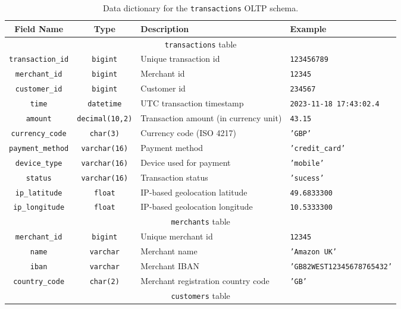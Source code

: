 \documentclass[11pt,a4paper,computermodern]{article}
\newcommand{\code}{\texttt}
\begin{document}
\begin{table}[ht]
	\centering
	\begin{threeparttable}
		\caption{Data dictionary for the \code{transactions} OLTP schema.}
		\label{table:OLTP}
		\begin{tabularx}{0.99\textwidth}{c c >{\centering\arraybackslash}X >{\centering\arraybackslash}X}
			\toprule
			Field Name & Type & Description & Example  \\
			\midrule
			\multicolumn{4}{c}{\code{transactions} table}\\
			\code{transaction\_id} & \code{bigint} & Unique transaction id & \code{123456789} \\
			\code{merchant\_id} & \code{bigint} & Merchant id & \code{12345} \\
			\code{customer\_id} & \code{bigint} & Customer id & \code{234567} \\
			\code{time} & \code{datetime} & UTC transaction timestamp & \code{2023-11-18 17:43:02.4} \\
			\code{amount} & \code{decimal(10,2)} & Transaction amount (in currency unit) & \code{43.15} \\
			\code{currency\_code} & \code{char(3)} & Currency code (ISO 4217) & \code{'GBP'} \\
			\code{payment\_method} & \code{varchar(16)} & Payment method & \code{'credit\_card'} \\
			\code{device\_type} & \code{varchar(16)} & Device used for payment & \code{'mobile'} \\
			\code{status} & \code{varchar(16)} & Transaction status & \code{'sucess'} \\
			\code{ip\_latitude} & \code{float} & IP-based geolocation latitude & \code{49.6833300} \\
			\code{ip\_longitude} & \code{float} & IP-based geolocation longitude & \code{10.5333300} \\
			\midrule
			\multicolumn{4}{c}{\code{merchants} table}\\
			\code{merchant\_id} & \code{bigint} & Unique merchant id & \code{12345} \\
			\code{name} & \code{varchar} & Merchant name & \code{'Amazon UK'} \\
			\code{iban} & \code{varchar} & Merchant IBAN & \code{'GB82WEST12345678765432'} \\
			\code{country\_code} & \code{char(2)} & Merchant registration country code & \code{'GB'} \\
			\midrule
			\multicolumn{4}{c}{\code{customers} table}\\

\end{tabularx}
\end{threeparttable}
\end{table}
\end{document}
